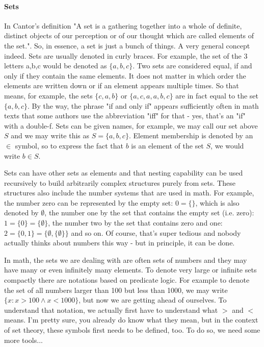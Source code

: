 \paragraph{Sets}
In Cantor's definition "A set is a gathering together into a whole of definite, distinct objects of our perception or of our thought which are called elements of the set.". So, in essence, a set is just a bunch of things. A very general concept indeed. Sets are usually denoted in curly braces. For example, the set of the 3 letters a,b,c would be denoted as $\{a,b,c\}$. Two sets are considered equal, if and only if they contain the same elements. It does not matter in which order the elements are written down or if an element appears multiple times. So that means, for example, the sets $\{c,a,b\}$ or $\{a,c,a,a,b,c\}$ are in fact equal to the set $\{a,b,c\}$. By the way, the phrase "if and only if" appears sufficiently often in math texts that some authors use the abbreviation "iff" for that - yes, that's an "if" with a double-f. Sets can be given names, for example, we may call our set above $S$ and we may write this as $S = \{a,b,c\}$. Element membership is denoted by an $\in$ symbol, so to express the fact that $b$ is an element of the set $S$, we would write $b \in S$. 

\medskip 
Sets can have other sets as elements and that nesting capability can be used recursively to build arbitrarily complex structures purely from sets. These structures also include the number systems that are used in math. For example, the number zero can be represented by the empty set: $0 = \{\}$, which is also denoted by $\emptyset$, the number one by the set that contains the empty set (i.e. zero): $1 = \{ 0 \} =  \{ \emptyset \}$, the number two by the set that contains zero and one: $2 = \{ 0, 1 \} = \{ \emptyset, \{ \emptyset \} \}$ and so on. Of course, that's super tedious and nobody actually thinks about numbers this way - but in principle, it can be done.

\medskip 
In math, the sets we are dealing with are often sets of numbers and they may have many or even infinitely many elements. To denote very large or infinite sets compactly there are notations based on predicate logic. For example to denote the set of all numbers larger than 100 but less than 1000, we may write $\{x : x > 100 \wedge x < 1000\}$, but now we are getting ahead of ourselves. To understand that notation, we actually first have to understand what $>$ and $<$ means. I'm pretty sure, you already do know what they mean, but in the context of set theory, these symbols first needs to be defined, too. To do so, we need some more tools...

